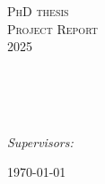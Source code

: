 \documentclass[
11pt, %
oneside, %
english, %
onehalfspacing,
headsepline, %
consistentlayout, %
reqno, %
]{MastersDoctoralThesis} %
\author{Daniel Sikar} %
\begin{document}
\frontmatter %

\pagestyle{plain} %


\begin{titlepage}
\begin{center}

\vspace*{.06\textheight}
{\scshape\LARGE \univname\par}\vspace{1.5cm} %
\textsc{\Large PhD thesis}\\[0.5cm] %
\textsc{\Large Project Report}\\[0.5cm]
\textsc{\Large 2025}\\[0.5cm]

\HRule \\[0.4cm] %
{\huge \bfseries \ttitle\par}\vspace{0.4cm} %
\HRule \\[3.5cm] %
 
\begin{flushleft} \large
\authorname \\ [1cm]

\emph{Supervisors:} 
\supname \\ [3.5cm] %
\end{flushleft}
 

 

{\large \today}\\[4cm] %
 
\end{center}
\end{titlepage}
\end{document}
